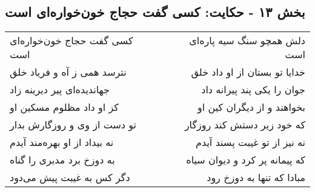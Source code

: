 \begin{center}
\section*{بخش ۱۳ - حکایت: کسی گفت حجاج خون‌خواره‌ای است}
\label{sec:013}
\begin{longtable}{l p{0.5cm} r}
کسی گفت حجاج خون‌خواره‌ای است
&&
دلش همچو سنگ سیه پاره‌ای است
\\
نترسد همی ز آه و فریاد خلق
&&
خدایا تو بستان از او داد خلق
\\
جهاندیده‌ای پیر دیرینه زاد
&&
جوان را یکی پند پیرانه داد
\\
کز او داد مظلوم مسکین او
&&
بخواهند و از دیگران کین او
\\
تو دست از وی و روزگارش بدار
&&
که خود زیر دستش کند روزگار
\\
نه بیداد از او بهره‌مند آیدم
&&
نه نیز از تو غیبت پسند آیدم
\\
به دوزخ برد مدبری را گناه
&&
که پیمانه پر کرد و دیوان سیاه
\\
دگر کس به غیبت پیش می‌دود
&&
مبادا که تنها به دوزخ رود
\\
\end{longtable}
\end{center}
